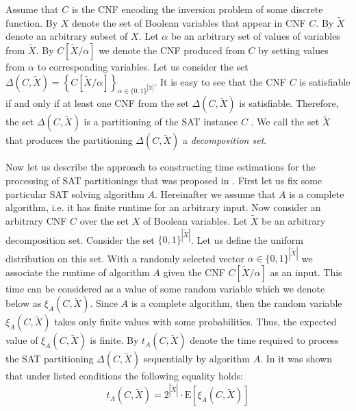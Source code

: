 \documentclass[runningheads,a4paper]{llncs}
\begin{document}
Assume that $C$ is the CNF encoding the inversion problem of some discrete function. By $X$ denote the set of Boolean variables that appear in CNF $C$. By $\tilde{X}$ denote an arbitrary subset of $X$. Let $\alpha$ be an arbitrary set of values of variables from $\tilde{X}$. By $C\left[\tilde{X}/\alpha\right]$ we denote the CNF produced from $C$ by setting values from $\alpha$ to corresponding variables. Let us consider the set $\Delta\left(C,\tilde{X}\right)=\left\{C\left[\tilde{X}/\alpha\right]\right\}_{\alpha\in\{0,1\}^{|\tilde{X}|}}$. It is easy to see that the CNF $C$ is satisfiable if and only if at least one CNF from the set $\Delta\left(C,\tilde{X}\right)$ is satisfiable. Therefore, the set $\Delta\left(C,\tilde{X}\right)$ is a partitioning of the SAT instance $C$ \cite{Hyvarinen11}. We call the set $\tilde{X}$ that produces the partitioning $\Delta\left(C,\tilde{X}\right)$ a \textit{decomposition set}.

Now let us describe the approach to constructing time estimations for the processing of SAT partitionings that was proposed in \cite{DBLP:journals/corr/SemenovZ13}. First let us fix some particular SAT solving algorithm $A$. Hereinafter we assume that $A$ is a complete algorithm, i.e. it has finite runtime for an arbitrary input. Now consider an arbitrary CNF $C$ over the set $X$ of Boolean variables. Let $\tilde{X}$ be an arbitrary decomposition set. Consider the set $\{0,1\}^{|\tilde{X}|}$. Let us define the uniform distribution on this set. With a randomly selected vector $\alpha\in\{0,1\}^{|\tilde{X}|}$ we associate the runtime of algorithm $A$ given the CNF $C\left[\tilde{X}/\alpha\right]$ as an input. This time can be considered as a value of some random variable which we denote below as $\xi_A\left(C,\tilde{X}\right)$. Since $A$ is a complete algorithm, then the random variable $\xi_A\left(C,\tilde{X}\right)$ takes only finite values with some probabilities. Thus, the expected value of $\xi_A\left(C,\tilde{X}\right)$ is finite. By $t_A\left(C,\tilde{X}\right)$ denote the time required to process the SAT partitioning $\Delta\left(C,\tilde{X}\right)$ sequentially by algorithm $A$. In \cite{DBLP:journals/corr/SemenovZ13} it was shown that under listed conditions the following equality holds:
\begin{equation}
\label{f4}
t_A\left(C,\tilde{X}\right)=2^{|\tilde{X}|}\cdot\mathrm{E}\left[\xi_A\left(C,\tilde{X}\right)\right]
\end{equation}
\end{document}
